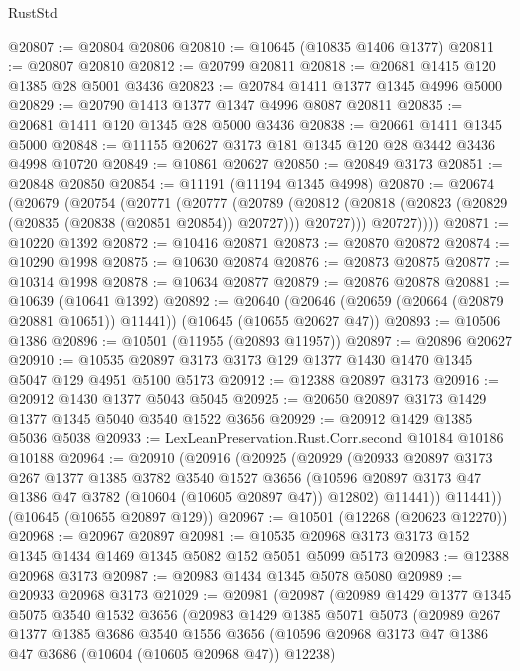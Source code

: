 \begin{lexlean}{RustStd}
\begin{coremodule}
@20807 := @20804 @20806
@20810 := @10645 (@10835 @1406 @1377)
@20811 := @20807 @20810
@20812 := @20799 @20811
@20818 := @20681 @1415 @120 @1385 @28 @5001 @3436
@20823 := @20784 @1411 @1377 @1345 @4996 @5000
@20829 := @20790 @1413 @1377 @1347 @4996 @8087 @20811
@20835 := @20681 @1411 @120 @1345 @28 @5000 @3436
@20838 := @20661 @1411 @1345 @5000
@20848 := @11155 @20627 @3173 @181 @1345 @120 @28 @3442 @3436 @4998 @10720
@20849 := @10861 @20627
@20850 := @20849 @3173
@20851 := @20848 @20850
@20854 := @11191 (@11194 @1345 @4998)
@20870 := @20674
    (@20679
      (@20754
        (@20771
          (@20777
            (@20789
              (@20812 (@20818 (@20823 (@20829 (@20835 (@20838 (@20851 @20854)) @20727))) @20727)))
            @20727))))
@20871 := @10220 @1392
@20872 := @10416 @20871
@20873 := @20870 @20872
@20874 := @10290 @1998
@20875 := @10630 @20874
@20876 := @20873 @20875
@20877 := @10314 @1998
@20878 := @10634 @20877
@20879 := @20876 @20878
@20881 := @10639 (@10641 @1392)
@20892 := @20640
    (@20646 (@20659 (@20664 (@20879 @20881 @10651)) @11441))
    (@10645 (@10655 @20627 @47))
@20893 := @10506 @1386
@20896 := @10501 (@11955 (@20893 @11957))
@20897 := @20896 @20627
@20910 := @10535 @20897 @3173 @3173 @129 @1377 @1430 @1470 @1345 @5047 @129 @4951 @5100 @5173
@20912 := @12388 @20897 @3173
@20916 := @20912 @1430 @1377 @5043 @5045
@20925 := @20650 @20897 @3173 @1429 @1377 @1345 @5040 @3540 @1522 @3656
@20929 := @20912 @1429 @1385 @5036 @5038
@20933 := LexLeanPreservation.Rust.Corr.second @10184 @10186 @10188
@20964 := @20910
    (@20916
      (@20925
        (@20929
          (@20933
            @20897
            @3173
            @267
            @1377
            @1385
            @3782
            @3540
            @1527
            @3656
            (@10596 @20897 @3173 @47 @1386 @47 @3782 (@10604 (@10605 @20897 @47)) @12802)
            @11441))
        @11441))
    (@10645 (@10655 @20897 @129))
@20967 := @10501 (@12268 (@20623 @12270))
@20968 := @20967 @20897
@20981 := @10535 @20968 @3173 @3173 @152 @1345 @1434 @1469 @1345 @5082 @152 @5051 @5099 @5173
@20983 := @12388 @20968 @3173
@20987 := @20983 @1434 @1345 @5078 @5080
@20989 := @20933 @20968 @3173
@21029 := @20981
    (@20987
      (@20989
        @1429
        @1377
        @1345
        @5075
        @3540
        @1532
        @3656
        (@20983
          @1429
          @1385
          @5071
          @5073
          (@20989
            @267
            @1377
            @1385
            @3686
            @3540
            @1556
            @3656
            (@10596 @20968 @3173 @47 @1386 @47 @3686 (@10604 (@10605 @20968 @47)) @12238)

\end{coremodule}
\end{lexlean}
